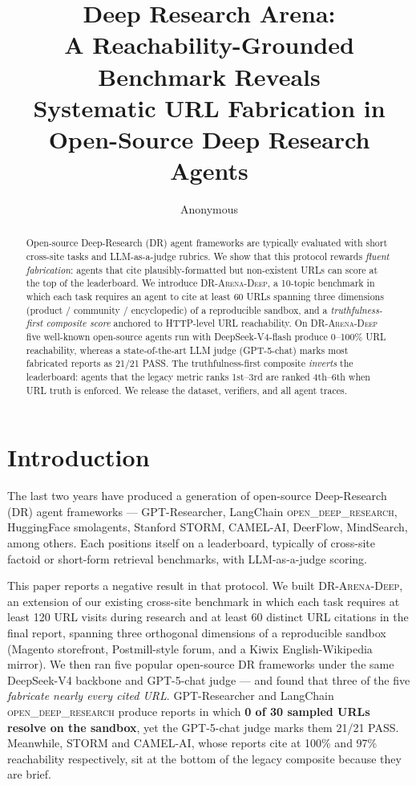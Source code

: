 \documentclass[11pt]{article}
\title{Deep Research Arena: \\[2pt]
       \large A Reachability-Grounded Benchmark Reveals\\
       Systematic URL Fabrication in Open-Source Deep Research Agents}
\author{%
  Anonymous \\
}
\date{}
\begin{document}
\maketitle

\begin{abstract}
Open-source Deep-Research (DR) agent frameworks are typically evaluated with
short cross-site tasks and LLM-as-a-judge rubrics. We show that this protocol
rewards \emph{fluent fabrication}: agents that cite plausibly-formatted but
non-existent URLs can score at the top of the leaderboard. We introduce
\textsc{DR-Arena-Deep}, a 10-topic benchmark in which each task requires
an agent to cite at least 60 URLs spanning three dimensions
(product / community / encyclopedic) of a reproducible sandbox, and a
\emph{truthfulness-first composite score} anchored to HTTP-level URL
reachability. On \textsc{DR-Arena-Deep} five well-known open-source agents
run with DeepSeek-V4-flash produce 0--100\% URL reachability, whereas a
state-of-the-art LLM judge (GPT-5-chat) marks most fabricated reports
as 21/21 PASS. The truthfulness-first composite \emph{inverts} the
leaderboard: agents that the legacy metric ranks 1st--3rd are ranked
4th--6th when URL truth is enforced. We release the dataset, verifiers,
and all agent traces.
\end{abstract}

\section{Introduction}
\label{sec:intro}

The last two years have produced a generation of open-source Deep-Research
(DR) agent frameworks --- GPT-Researcher, LangChain \textsc{open\_deep\_research},
HuggingFace smolagents, Stanford STORM, CAMEL-AI, DeerFlow, MindSearch,
among others. Each positions itself on a leaderboard, typically of cross-site
factoid or short-form retrieval benchmarks, with LLM-as-a-judge scoring.

This paper reports a negative result in that protocol. We built
\textsc{DR-Arena-Deep}, an extension of our existing cross-site benchmark in
which each task requires at least 120 URL visits during research and at
least 60 distinct URL citations in the final report, spanning three
orthogonal dimensions of a reproducible sandbox (Magento storefront,
Postmill-style forum, and a Kiwix English-Wikipedia mirror). We then ran
five popular open-source DR frameworks under the same DeepSeek-V4 backbone
and GPT-5-chat judge --- and found that three of the five \emph{fabricate
nearly every cited URL}. GPT-Researcher and LangChain
\textsc{open\_deep\_research} produce reports in which \textbf{0 of 30
sampled URLs resolve on the sandbox}, yet the GPT-5-chat judge marks
them 21/21 PASS. Meanwhile, STORM and CAMEL-AI, whose reports cite at
100\% and 97\% reachability respectively, sit at the bottom of the
legacy composite because they are brief.
\end{document}
